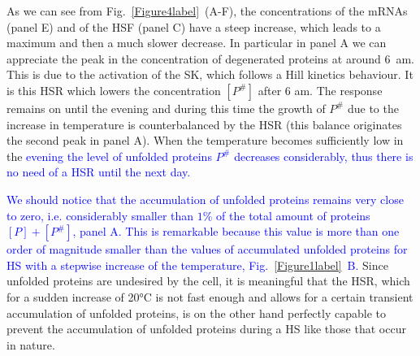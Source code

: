 \documentclass[oneside, 10pt, a4paper, twocolumn]{article}
\begin{document}
As we can see from Fig.~\ref{Figure4label}~(A-F), the concentrations of the mRNAs (panel E) and of the HSF (panel C) have a steep increase, which leads to a maximum and then a much slower decrease. In particular in panel A we can appreciate the peak in the concentration of degenerated proteins at around 6~am. This is due to the activation of the SK, which follows a Hill kinetics behaviour. It is this HSR which lowers the concentration $\left[P^\#\right]$ after 6 am. The response remains on until the evening and during this time the growth of $P^\#$  due to the increase in temperature is counterbalanced by the HSR (this balance originates the second peak in panel A). When the temperature becomes sufficiently low in the \textcolor{blue}{evening the level of unfolded proteins $P^\#$ decreases considerably, thus there is no need of a HSR until the next day. }

\textcolor{blue}{We should notice that the accumulation of unfolded proteins remains very close to zero, i.e. considerably smaller than $1\%$ of the total amount of proteins $\left[P\right]+\left[P^\#\right]$, panel A. This is remarkable because this value is more than one order of magnitude smaller than the values of accumulated unfolded proteins for HS with a stepwise increase of the temperature, Fig.~\ref{Figure1label}~B.} Since unfolded proteins are undesired by the cell, it is meaningful that the HSR, which for a sudden increase of 20°C is not fast enough and allows for a certain transient accumulation of unfolded proteins, is on the other hand perfectly capable to prevent the accumulation of unfolded proteins during a HS like those that occur in nature. 
\end{document}
